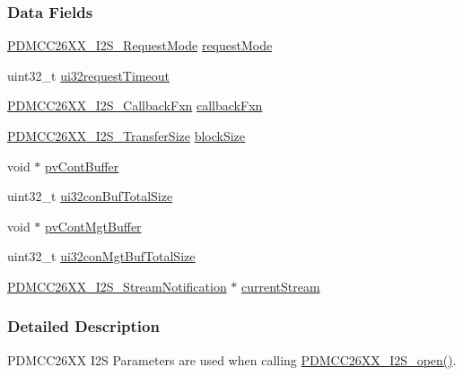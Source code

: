 \subsubsection*{Data Fields}
\begin{DoxyCompactItemize}
\item 
\hyperlink{_p_d_m_c_c26_x_x__util_8h_aef896b2a7fc07d3b145f8d02eaa9e377}{P\+D\+M\+C\+C26\+X\+X\+\_\+\+I2\+S\+\_\+\+Request\+Mode} \hyperlink{struct_p_d_m_c_c26_x_x___i2_s___params_a2bd373c5a35eb5708499735ad1d1b0bb}{request\+Mode}
\item 
uint32\+\_\+t \hyperlink{struct_p_d_m_c_c26_x_x___i2_s___params_a26074008d5b2519b42820cc9602d3710}{ui32request\+Timeout}
\item 
\hyperlink{_p_d_m_c_c26_x_x__util_8h_a82786f08d1b22895c79dcd8880fb92f3}{P\+D\+M\+C\+C26\+X\+X\+\_\+\+I2\+S\+\_\+\+Callback\+Fxn} \hyperlink{struct_p_d_m_c_c26_x_x___i2_s___params_a00d6ad911e30febe21d265d9808859b3}{callback\+Fxn}
\item 
\hyperlink{_p_d_m_c_c26_x_x__util_8h_a5b4e6b7c39c913bc6ae97261a5f2a226}{P\+D\+M\+C\+C26\+X\+X\+\_\+\+I2\+S\+\_\+\+Transfer\+Size} \hyperlink{struct_p_d_m_c_c26_x_x___i2_s___params_a2e982ff324a5a27b0cefb2bb8687b6dc}{block\+Size}
\item 
void $\ast$ \hyperlink{struct_p_d_m_c_c26_x_x___i2_s___params_a5298f177d4658f5322a28ef42dc0149d}{pv\+Cont\+Buffer}
\item 
uint32\+\_\+t \hyperlink{struct_p_d_m_c_c26_x_x___i2_s___params_aa602775d0906685e522eb949562bf613}{ui32con\+Buf\+Total\+Size}
\item 
void $\ast$ \hyperlink{struct_p_d_m_c_c26_x_x___i2_s___params_ac8f783b111a55c3297e970504612e05a}{pv\+Cont\+Mgt\+Buffer}
\item 
uint32\+\_\+t \hyperlink{struct_p_d_m_c_c26_x_x___i2_s___params_aac40d4e38985144bfe1bddc9b42ac04a}{ui32con\+Mgt\+Buf\+Total\+Size}
\item 
\hyperlink{struct_p_d_m_c_c26_x_x___i2_s___stream_notification}{P\+D\+M\+C\+C26\+X\+X\+\_\+\+I2\+S\+\_\+\+Stream\+Notification} $\ast$ \hyperlink{struct_p_d_m_c_c26_x_x___i2_s___params_aaabb96f9076a3e32f28c22164ab32159}{current\+Stream}
\end{DoxyCompactItemize}


\subsubsection{Detailed Description}
P\+D\+M\+C\+C26\+X\+X I2\+S Parameters are used when calling \hyperlink{_p_d_m_c_c26_x_x__util_8h_a8168bcdab9f1e46c26823555df6f797f}{P\+D\+M\+C\+C26\+X\+X\+\_\+\+I2\+S\+\_\+open()}. 

